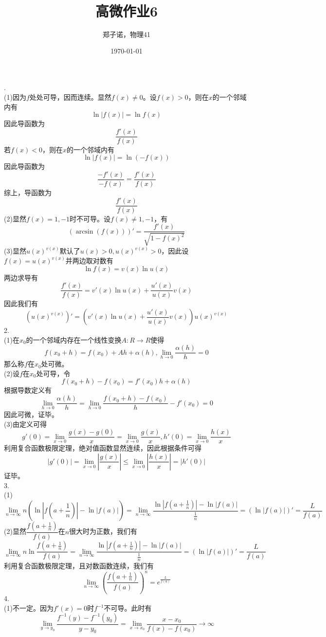 \documentclass[utf8]{ctexart}
\title{高微作业6}
\author{郑子诺，物理41}
\date{\today}
\begin{document}
\maketitle
{}.\\
(1)因为$f$处处可导，因而连续。显然$f(x)\neq0$。设$f(x)>0$，则在$x$的一个邻域内有
\[\ln|f(x)|=\ln f(x)\]
因此导函数为
\[\frac{f'(x)}{f(x)}\]
若$f(x)<0$，则在$x$的一个邻域内有
\[\ln|f(x)|=\ln(-f(x))\]
因此导函数为
\[\frac{-f'(x)}{-f(x)}=\frac{f'(x)}{f(x)}\]
综上，导函数为
\[\frac{f'(x)}{f(x)}\]
(2)显然$f(x)=1,-1$时不可导。设$f(x)\neq1,-1$，有
\[(\arcsin(f(x)))'=\frac{f'(x)}{\sqrt{1-f(x)^2}}\]
(3)显然$u(x)^{v(x)}$默认了$u(x)>0,u(x)^{v(x)}>0$，因此设$f(x)=u(x)^{v(x)}$并两边取对数有
\[\ln f(x)=v(x)\ln u(x)\]
两边求导有
\[\frac{f'(x)}{f(x)}=v'(x)\ln u(x)+\frac{u'(x)}{u(x)}v(x)\]
因此我们有
\[(u(x)^{v(x)})'=(v'(x)\ln u(x)+\frac{u'(x)}{u(x)}v(x))u(x)^{v(x)}\]
2.\\
(1)在$x_0$的一个邻域内存在一个线性变换$A:R\rightarrow R$使得
\[f(x_0+h)=f(x_0)+Ah+\alpha(h),\lim\limits_{h\rightarrow0}\frac{\alpha(h)}{h}=0\]
那么称$f$在$x_0$处可微。\\
(2)设$f$在$x_0$处可导，令
\[f(x_0+h)-f(x_0)=f'(x_0)h+\alpha(h)\]
根据导数定义有
\[\lim\limits_{h\rightarrow0}\frac{\alpha(h)}{h}=\lim\limits_{h\rightarrow0}\frac{f(x_0+h)-f(x_0)}{h}-f'(x_0)=0\]
因此可微，证毕。\\
(3)由定义可得
\[g'(0)=\lim\limits_{x\rightarrow0}\frac{g(x)-g(0)}{x}=\lim\limits_{x\rightarrow0}\frac{g(x)}{x},h'(0)=\lim\limits_{x\rightarrow0}\frac{h(x)}{x}\]
利用复合函数极限定理，绝对值函数显然连续，因此根据条件可得
\[|g'(0)|=\lim\limits_{x\rightarrow0}|\frac{g(x)}{x}|\le\lim\limits_{x\rightarrow0}|\frac{h(x)}{x}|=|h'(0)|\]
证毕。\\
3.\\
(1)\[\lim\limits_{n\rightarrow\infty}n(\ln|f(a+\frac{1}{n})|-\ln|f(a)|)=\lim\limits_{n\rightarrow\infty}\frac{\ln|f(a+\frac{1}{n})|-\ln|f(a)|}{\frac{1}{n}}=(\ln|f(a)|)'=\frac{L}{f(a)}\]
(2)显然$\dfrac{f(a+\frac{1}{n})}{f(a)}$在$n$很大时为正数，我们有
\[\lim\limits_{n\rightarrow\infty}n\ln\frac{f(a+\frac{1}{n})}{f(a)}=\lim\limits_{n\rightarrow\infty}\frac{\ln|f(a+\frac{1}{n})|-\ln|f(a)|}{\frac{1}{n}}=(\ln|f(a)|)'=\frac{L}{f(a)}\]
利用复合函数极限定理，且对数函数连续，我们有
\[\lim\limits_{n\rightarrow\infty}(\frac{f(a+\frac{1}{n})}{f(a)})^n=e^{\frac{L}{f(a)}}\]
4.\\
(1)不一定。因为$f'(x)=0$时$f^{-1}$不可导。此时有
\[\lim\limits_{y\rightarrow y_0}\frac{f^{-1}(y)-f^{-1}(y_0)}{y-y_0}=\lim\limits_{x\rightarrow x_0}\frac{x-x_0}{f(x)-f(x_0)}\rightarrow\infty\]
\end{document}
